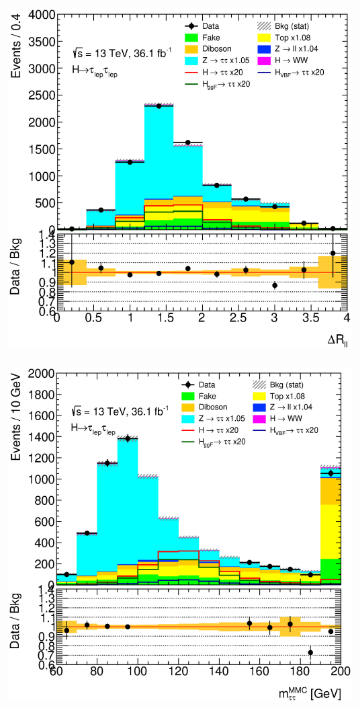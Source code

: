 \begin{figure}[htb]
    \centering
    \begin{subfigure}[t]{0.3\textwidth}
        \includegraphics[width=\textwidth]{./plots/mva/modeling/input_vars/BOOST_DF/ll-CutMVABoostedCatDF-DeltaRLL-lin.eps}
    \end{subfigure}
    \begin{subfigure}[t]{0.3\textwidth}
        \includegraphics[width=\textwidth]{./plots/mva/modeling/input_vars/BOOST_DF/ll-CutMVABoostedCatDF-dilep_mmc_mlm_m-lin.eps}

\end{subfigure}
\end{figure}
